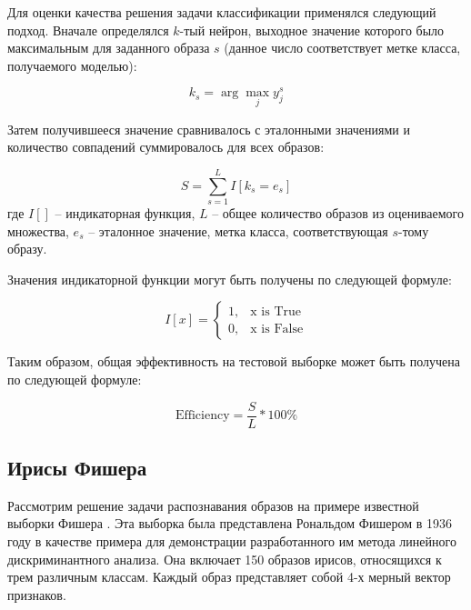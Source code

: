 Для оценки качества решения задачи классификации применялся следующий подход. Вначале определялся $k$-тый нейрон, выходное значение которого было максимальным для заданного образа $s$ (данное число соответствует метке класса, получаемого моделью):

\begin{equation}
k_s = \arg \max_j y_j^s
\end{equation}

Затем получившееся значение сравнивалось с эталонными значениями и количество совпадений суммировалось для всех образов:

\begin{equation}
S = \sum_{s=1}^{L} I[k_s = e_s]
\end{equation}
где $I[]$ -- индикаторная функция, $L$ -- общее количество образов из оцениваемого множества, $e_s$ -- эталонное значение, метка класса, соответствующая $s$-тому образу.

Значения индикаторной функции могут быть получены по следующей формуле:

\begin{equation*}
    I[x] = 
    \begin{cases}
        1, & \text{x is True} \\
        0, & \text{x is False}
    \end{cases}
\end{equation*}

Таким образом, общая эффективность на тестовой выборке может быть получена по следующей формуле:

\begin{equation}
\text{Efficiency} = \frac{S}{L} * 100\%
\end{equation}


\subsection{Ирисы Фишера}

Рассмотрим решение задачи распознавания образов на примере известной выборки Фишера \cite{Fisher}. Эта выборка была представлена Рональдом Фишером в 1936 году в качестве примера для демонстрации разработанного им метода линейного дискриминантного анализа. Она включает 150 образов ирисов, относящихся к трем различным классам. Каждый образ представляет собой 4-х мерный вектор признаков.

